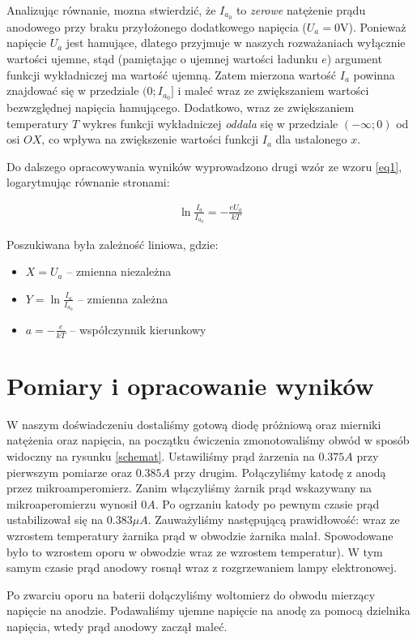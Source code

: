 \documentclass[a4paper]{article}
\newlength{\du}
\begin{document}
Analizując równanie, mozna stwierdzić, że $I_{a_0}$ to \textit{zerowe} natężenie prądu anodowego przy
braku przyłożonego dodatkowego napięcia ($U_a = 0 \text{V}$). Ponieważ napięcie $U_a$ jest hamujące,
dlatego przyjmuje w naszych rozważaniach wyłącznie wartości ujemne, stąd (pamiętając o ujemnej wartości
ładunku $e$) argument funkcji wykładniczej ma wartość ujemną. Zatem mierzona wartość $I_a$ powinna 
znajdować się w przedziale $(0; I_{a_0}]$ i maleć wraz ze zwiększaniem wartości bezwzględnej
napięcia hamującego. Dodatkowo, wraz ze zwiększaniem temperatury $T$ wykres funkcji wykładniczej
\textit{oddala} się w przedziale $(-\infty; 0)$ od osi $OX$, co wpływa na zwiększenie wartości funkcji
$I_a$ dla ustalonego $x$.

Do dalszego opracowywania wyników wyprowadzono drugi wzór ze wzoru \ref{eq1}, logarytmując równanie
stronami:

\begin{align}
	\ln{\frac{I_a}{I_{a_0}}} = -\frac{e U_a}{k T}
\label{eq2}
\end{align}

Poszukiwana była zależność liniowa, gdzie:
\begin{itemize}
\item $X = U_a$ -- zmienna niezależna
\item $Y = \ln \frac{I_a}{I_{a_0}}$ -- zmienna zależna
\item $a = -\frac{e}{kT}$ -- współczynnik kierunkowy
\end{itemize}


\section{Pomiary i opracowanie wyników}
W naszym doświadczeniu dostaliśmy gotową diodę próżniową oraz mierniki natężenia oraz napięcia,
na początku ćwiczenia zmonotowaliśmy obwód w sposób widoczny na rysunku \ref{schemat}.
Ustawiliśmy prąd żarzenia na $0.375 A$ przy pierwszym pomiarze oraz $0.385 A$ przy drugim.
Połączyliśmy katodę z anodą przez mikroamperomierz.
Zanim włączyliśmy żarnik prąd wskazywany na mikroaperomierzu wynosił $0A$.
Po ogrzaniu katody po pewnym czasie prąd ustabilizował się na $0.383 \mu A$.
Zauważyliśmy następującą prawidłowość: wraz ze wzrostem temperatury żarnika prąd w obwodzie żarnika malał.
Spowodowane było to wzrostem oporu w obwodzie wraz ze wzrostem temperatur).
W tym samym czasie prąd anodowy rosnął wraz z rozgrzewaniem lampy elektronowej.

Po zwarciu oporu na baterii dołączyliśmy woltomierz do obwodu mierzący napięcie na anodzie.
Podawaliśmy ujemne napięcie na anodę za pomocą dzielnika napięcia, wtedy prąd anodowy zaczął maleć.
\end{document}
